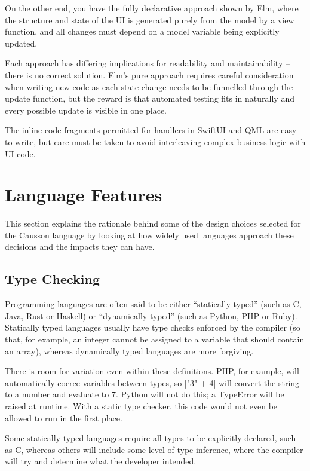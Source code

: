 \documentclass[11pt]{report}
\begin{document}
On the other end, you have the fully declarative approach shown by Elm, where the structure and state of the UI is generated purely from the model by a view function, and all changes must depend on a model variable being explicitly updated.

Each approach has differing implications for readability and maintainability – there is no correct solution. Elm's pure approach requires careful consideration when writing new code as each state change needs to be funnelled through the update function, but the reward is that automated testing fits in naturally and every possible update is visible in one place.

The inline code fragments permitted for handlers in SwiftUI and QML are easy to write, but care must be taken to avoid interleaving complex business logic with UI code.

\section{Language Features}

This section explains the rationale behind some of the design choices selected for the Causson language by looking at how widely used languages approach these decisions and the impacts they can have.

\subsection{Type Checking}

Programming languages are often said to be either “statically typed” (such as C, Java, Rust or Haskell) or “dynamically typed” (such as Python, PHP or Ruby). Statically typed languages usually have type checks enforced by the compiler (so that, for example, an integer cannot be assigned to a variable that should contain an array), whereas dynamically typed languages are more forgiving.

There is room for variation even within these definitions. PHP, for example, will automatically coerce variables between types, so |"3" + 4| will convert the string to a number and evaluate to 7. Python will not do this; a TypeError will be raised at runtime. With a static type checker, this code would not even be allowed to run in the first place.

Some statically typed languages require all types to be explicitly declared, such as C, whereas others will include some level of type inference, where the compiler will try and determine what the developer intended.
\end{document}
